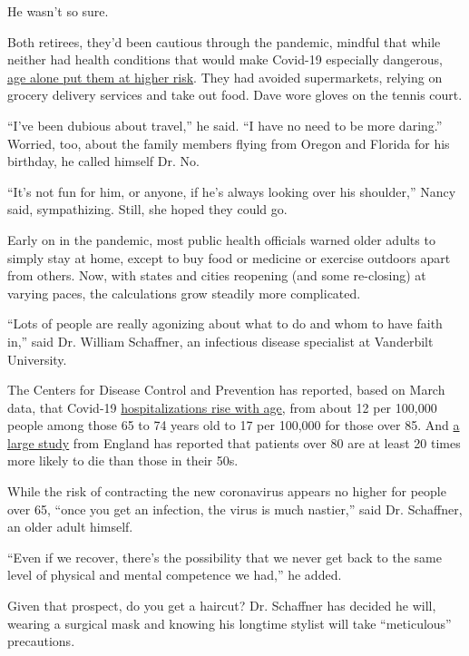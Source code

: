 He wasn't so sure.

Both retirees, they'd been cautious through the pandemic, mindful that
while neither had health conditions that would make Covid-19 especially
dangerous,
\href{https://www.nytimes3xbfgragh.onion/2020/07/08/health/coronavirus-risk-factors.html}{age
alone put them at higher risk}. They had avoided supermarkets, relying
on grocery delivery services and take out food. Dave wore gloves on the
tennis court.

``I've been dubious about travel,'' he said. ``I have no need to be more
daring.'' Worried, too, about the family members flying from Oregon and
Florida for his birthday, he called himself Dr. No.

``It's not fun for him, or anyone, if he's always looking over his
shoulder,'' Nancy said, sympathizing. Still, she hoped they could go.

Early on in the pandemic, most public health officials warned older
adults to simply stay at home, except to buy food or medicine or
exercise outdoors apart from others. Now, with states and cities
reopening (and some re-closing) at varying paces, the calculations grow
steadily more complicated.

``Lots of people are really agonizing about what to do and whom to have
faith in,'' said Dr. William Schaffner, an infectious disease specialist
at Vanderbilt University.

The Centers for Disease Control and Prevention has reported, based on
March data, that Covid-19
\href{https://www.cdc.gov/mmwr/volumes/69/wr/mm6915e3.htm}{hospitalizations
rise with age}, from about 12 per 100,000 people among those 65 to 74
years old to 17 per 100,000 for those over 85. And
\href{https://www.nytimes3xbfgragh.onion/2020/07/08/health/coronavirus-risk-factors.html}{a
large study} from England has reported that patients over 80 are at
least 20 times more likely to die than those in their 50s.

While the risk of contracting the new coronavirus appears no higher for
people over 65, ``once you get an infection, the virus is much
nastier,'' said Dr. Schaffner, an older adult himself.

``Even if we recover, there's the possibility that we never get back to
the same level of physical and mental competence we had,'' he added.

Given that prospect, do you get a haircut? Dr. Schaffner has decided he
will, wearing a surgical mask and knowing his longtime stylist will take
``meticulous'' precautions.


